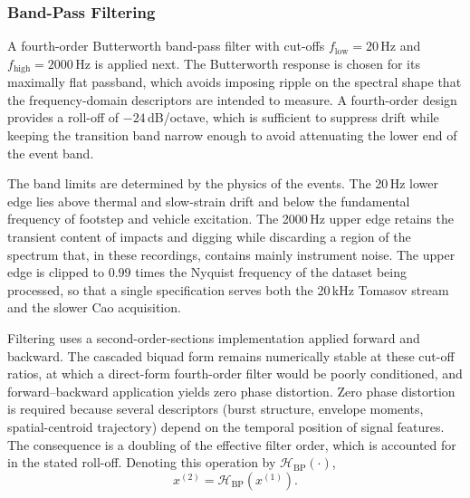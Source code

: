 \subsubsection{Band-Pass Filtering}
\label{sec:chap3Filtering}
A fourth-order Butterworth band-pass filter with cut-offs $f_{\mathrm{low}} = 20$\,Hz and $f_{\mathrm{high}} = 2000$\,Hz is applied next. The Butterworth response is chosen for its maximally flat passband, which avoids imposing ripple on the spectral shape that the frequency-domain descriptors are intended to measure. A fourth-order design provides a roll-off of $-24$\,dB/octave, which is sufficient to suppress drift while keeping the transition band narrow enough to avoid attenuating the lower end of the event band.

The band limits are determined by the physics of the events. The 20\,Hz lower edge lies above thermal and slow-strain drift and below the fundamental frequency of footstep and vehicle excitation. The 2000\,Hz upper edge retains the transient content of impacts and digging while discarding a region of the spectrum that, in these recordings, contains mainly instrument noise. The upper edge is clipped to $0.99$ times the Nyquist frequency of the dataset being processed, so that a single specification serves both the 20\,kHz Tomasov stream and the slower Cao acquisition.

Filtering uses a second-order-sections implementation applied forward and backward. The cascaded biquad form remains numerically stable at these cut-off ratios, at which a direct-form fourth-order filter would be poorly conditioned, and forward--backward application yields zero phase distortion. Zero phase distortion is required because several descriptors (burst structure, envelope moments, spatial-centroid trajectory) depend on the temporal position of signal features. The consequence is a doubling of the effective filter order, which is accounted for in the stated roll-off. Denoting this operation by $\mathcal{H}_{\mathrm{BP}}(\cdot)$,
\begin{equation}
	x^{(2)} = \mathcal{H}_{\mathrm{BP}}\!\left(x^{(1)}\right).
	\label{eq:bandpass}
\end{equation}

